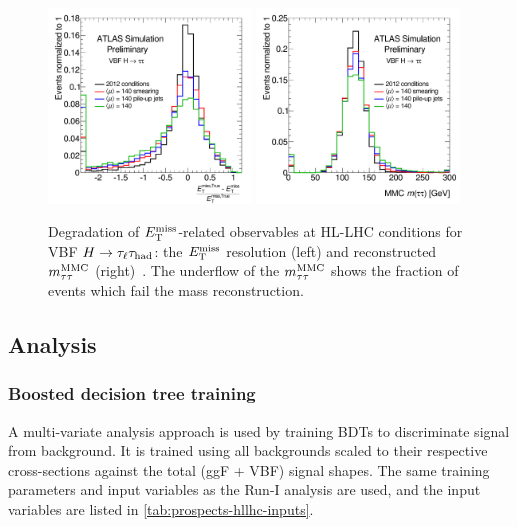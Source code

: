 \begin{figure}[tp]
  \centering
  \includegraphics[width=0.48\textwidth]{figures/ATL-PHYS-PUB-2014-018/fig_01a}
  \includegraphics[width=0.48\textwidth]{figures/ATL-PHYS-PUB-2014-018/fig_01b}
  \caption{Degradation of $E_{\mathrm{T}}^{\mathrm{miss}}$-related observables at HL-LHC conditions for VBF $H\rightarrow\tau_\ell\tau_\text{had}$: the $E_{\mathrm{T}}^{\mathrm{miss}}$ resolution (left) and reconstructed $m_{\tau\tau}^\text{MMC}$ (right)~\cite{ATL-PHYS-PUB-2014-018}. The underflow of the $m_{\tau\tau}^\text{MMC}$ shows the fraction of events which fail the mass reconstruction.}
  \label{fig:prospects-hllhc-degradation}
\end{figure}

\subsection{Analysis}

\subsubsection{Boosted decision tree training}

A multi-variate analysis approach is used by training BDTs to discriminate signal from background. It is trained using all backgrounds scaled to their respective cross-sections against the total (ggF + VBF) signal shapes. The same training parameters and input variables as the Run-I analysis are used, and the input variables are listed in \cref{tab:prospects-hllhc-inputs}.

